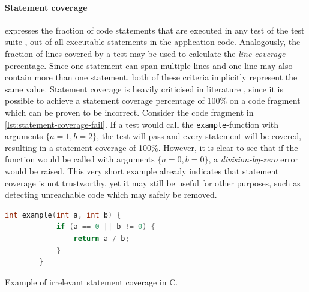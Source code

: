 \paragraph*{Statement coverage} expresses the fraction of code statements that are executed in any test of the test suite \cite{6588537}, out of all executable statements in the application code. Analogously, the fraction of lines covered by a test may be used to calculate the \emph{line coverage} percentage. Since one statement can span multiple lines and one line may also contain more than one statement, both of these criteria implicitly represent the same value. Statement coverage is heavily criticised in literature \cite[p.~37]{Myers:2011:AST:2161638}, since it is possible to achieve a statement coverage percentage of 100\% on a code fragment which can be proven to be incorrect. Consider the code fragment in \autoref{lst:statement-coverage-fail}. If a test would call the \texttt{example}-function with arguments $\{a = 1, b = 2\}$, the test will pass and every statement will be covered, resulting in a statement coverage of 100\%. However, it is clear to see that if the function would be called with arguments $\{a = 0, b = 0\}$, a \emph{division-by-zero} error would be raised. This very short example already indicates that statement coverage is not trustworthy, yet it may still be useful for other purposes, such as detecting unreachable code which may safely be removed.

\begin{listing}
	\begin{lstlisting}[language=C]
		int example(int a, int b) {
			if (a == 0 || b != 0) {
				return a / b;
			}
		}
	\end{lstlisting}
	\captionsetup{skip=-2pt}
	\caption{Example of irrelevant statement coverage in C.}
	\label{lst:statement-coverage-fail}
\end{listing}

